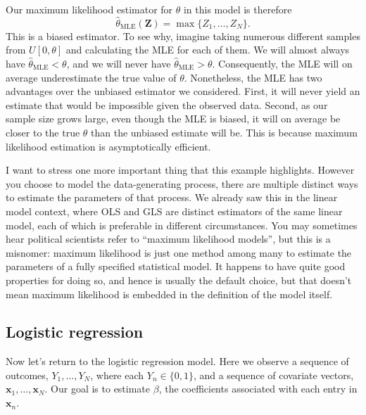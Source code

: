 \documentclass[
  12pt,
  oneside,openany]{book}
\begin{document}
Our maximum likelihood estimator for \(\theta\) in this model is therefore
\[
\hat{\theta}_{\text{MLE}}(\mathbf{Z}) = \max \{ Z_1, \ldots, Z_N \}.
\]
This is a biased estimator.
To see why, imagine taking numerous different samples from \(U[0, \theta]\) and calculating the MLE for each of them.
We will almost always have \(\hat{\theta}_{\text{MLE}} < \theta\), and we will never have \(\hat{\theta}_{\text{MLE}} > \theta\).
Consequently, the MLE will on average underestimate the true value of \(\theta\).
Nonetheless, the MLE has two advantages over the unbiased estimator we considered.
First, it will never yield an estimate that would be impossible given the observed data.
Second, as our sample size grows large, even though the MLE is biased, it will on average be closer to the true \(\theta\) than the unbiased estimate will be.
This is because maximum likelihood estimation is asymptotically efficient.

I want to stress one more important thing that this example highlights.
However you choose to model the data-generating process, there are multiple distinct ways to estimate the parameters of that process.
We already saw this in the linear model context, where OLS and GLS are distinct estimators of the same linear model, each of which is preferable in different circumstances.
You may sometimes hear political scientists refer to ``maximum likelihood models'', but this is a misnomer: maximum likelihood is just one method among many to estimate the parameters of a fully specified statistical model.
It happens to have quite good properties for doing so, and hence is usually the default choice, but that doesn't mean maximum likelihood is embedded in the definition of the model itself.

\hypertarget{logistic-regression}{%
\subsection{Logistic regression}\label{logistic-regression}}

Now let's return to the logistic regression model.
Here we observe a sequence of outcomes, \(Y_1, \ldots, Y_N\), where each \(Y_n \in \{0, 1\}\), and a sequence of covariate vectors, \(\mathbf{x}_1, \ldots, \mathbf{x}_N\).
Our goal is to estimate \(\beta\), the coefficients associated with each entry in \(\mathbf{x}_n\).
\end{document}
